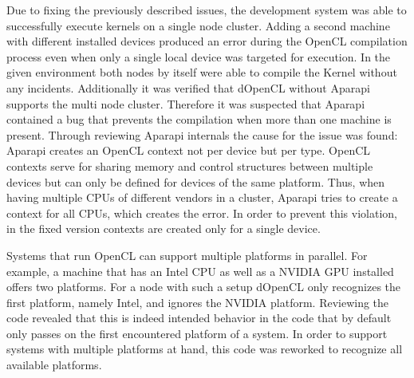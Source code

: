 \begin{description}[style=nextline]
	\item [Failed compilations when using multiple devices]
	Due to fixing the previously described issues, the development system was able to successfully execute kernels on a single node cluster. Adding a second machine with different installed devices produced an error during the OpenCL compilation process even when only a single local device was targeted for execution. In the given environment both nodes by itself were able to compile the Kernel without any incidents. Additionally it was verified that dOpenCL without Aparapi supports the multi node cluster. Therefore it was suspected that Aparapi contained a bug that prevents the compilation when more than one machine is present. Through reviewing Aparapi internals the cause for the issue was found: Aparapi creates an OpenCL context not per device but per type. OpenCL contexts serve for sharing memory and control structures between multiple devices but can only be defined for devices of the same platform. Thus, when having multiple CPUs of different vendors in a cluster, Aparapi tries to create a context for all CPUs, which creates the error. In order to prevent this violation, in the fixed version contexts are created only for a single device.

	\item [Multiple platforms per machine]
	Systems that run OpenCL can support multiple platforms in parallel. For example, a machine that has an Intel CPU as well as a NVIDIA GPU installed offers two platforms. For a node with such a setup dOpenCL only recognizes the first platform, namely Intel, and ignores the NVIDIA platform. Reviewing the code revealed that this is indeed intended behavior in the code that by default only passes on the first encountered platform of a system. In order to support systems with multiple platforms at hand, this code was reworked to recognize all available platforms.

\end{description}


